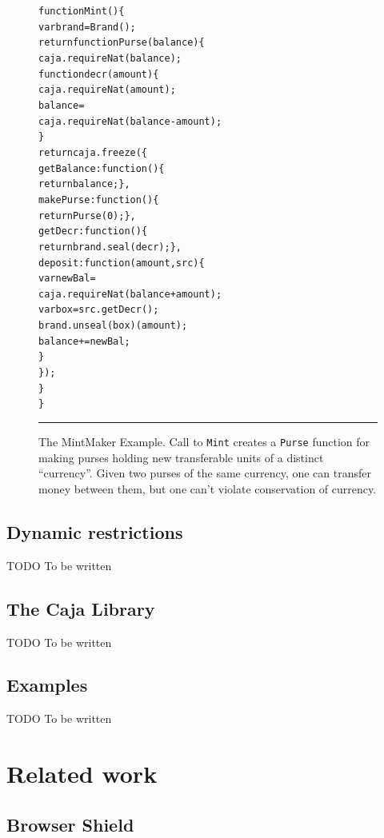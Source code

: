 \documentclass[letterpaper,twocolumn,10pt]{article}
\newcommand{\code}[1]{{\tt {#1}}}              %
\begin{document}
\begin{figure}[t!]
\begin{alltt}
function Mint() \{
  var brand = Brand();
  return function Purse(balance) \{
    caja.requireNat(balance);
    function decr(amount) \{
      caja.requireNat(amount);
      balance = 
        caja.requireNat(balance - amount);
    \}
    return caja.freeze(\{
      getBalance: function() \{
        return balance; \},
      makePurse:  function() \{
        return Purse(0); \},
      getDecr:    function() \{
        return brand.seal(decr); \},
      deposit: function(amount,src) \{
        var newBal = 
          caja.requireNat(balance+amount);
        var box = src.getDecr();
        brand.unseal(box)(amount);
        balance += newBal;
      \}
    \});
  \}
\}
\end{alltt}

\caption[The MintMaker Example]{The MintMaker Example. Call to \code{Mint} 
creates a \code{Purse} function for making purses holding new transferable 
units of a distinct ``currency''. Given two purses of the same currency, one 
can transfer money between them, but one can't violate conservation of 
currency.
\\ } \hrule
\label{fig:mintmaker}
\end{figure}



\subsection{Dynamic restrictions}

TODO To be written

\subsection{The Caja Library}

TODO To be written

\subsection{Examples}

TODO To be written

\section{Related work}
\label{sec:related}

\subsection{Browser Shield}
\end{document}
